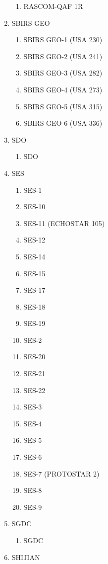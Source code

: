 \begin{multicols}{2}
\begin{enumerate}
  \begin{enumerate}
    \item RASCOM-QAF 1R
  \end{enumerate}
  \item SBIRS GEO
  \begin{enumerate}
    \item SBIRS GEO-1 (USA 230)
    \item SBIRS GEO-2 (USA 241)
    \item SBIRS GEO-3 (USA 282)
    \item SBIRS GEO-4 (USA 273)
    \item SBIRS GEO-5 (USA 315)
    \item SBIRS GEO-6 (USA 336)
  \end{enumerate}
  \item SDO
  \begin{enumerate}
    \item SDO
  \end{enumerate}
  \item SES
  \begin{enumerate}
    \item SES-1
    \item SES-10
    \item SES-11 (ECHOSTAR 105)
    \item SES-12
    \item SES-14
    \item SES-15
    \item SES-17
    \item SES-18
    \item SES-19
    \item SES-2
    \item SES-20
    \item SES-21
    \item SES-22
    \item SES-3
    \item SES-4
    \item SES-5
    \item SES-6
    \item SES-7 (PROTOSTAR 2)
    \item SES-8
    \item SES-9
  \end{enumerate}
  \item SGDC
  \begin{enumerate}
    \item SGDC
  \end{enumerate}
  \item SHIJIAN

\end{enumerate}
\end{multicols}
